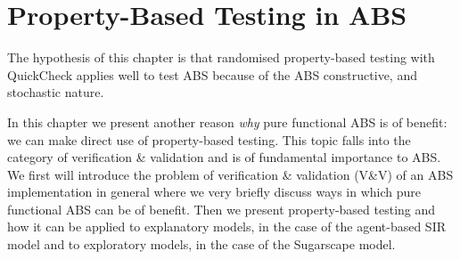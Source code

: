 \chapter{Property-Based Testing in ABS}
\label{ch:property}

The hypothesis of this chapter is that randomised property-based testing with QuickCheck applies well to test ABS because of the ABS constructive, and stochastic nature.

In this chapter we present another reason \textit{why} pure functional ABS is of benefit: we can make direct use of property-based testing. This topic falls into the category of verification \& validation and is of fundamental importance to ABS. We first will introduce the problem of verification \& validation (V\&V) of an ABS implementation in general where we very briefly discuss ways in which pure functional ABS can be of benefit. Then we present property-based testing and how it can be applied to explanatory models, in the case of the agent-based SIR model and to exploratory models, in the case of the Sugarscape model.









